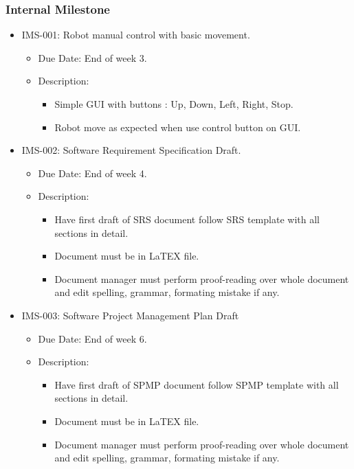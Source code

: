 \documentclass[11pt, a4paper]{article}
\begin{document}
		\subsubsection{Internal Milestone}
			\begin{itemize}
				\item IMS-001: Robot manual control with basic movement.
				\begin{itemize}
					\item Due Date: End of week 3.
					\item Description:
					\begin{itemize}
						\item Simple GUI with buttons : Up, Down, Left, Right, Stop.
						\item Robot move as expected when use control button on GUI.
					\end{itemize}
				\end{itemize}
				\item IMS-002: Software Requirement Specification Draft.
				\begin{itemize}
					\item Due Date: End of week 4.
					\item Description:
					\begin{itemize}
						\item Have first draft of SRS document follow SRS template with all sections in detail.
						\item Document must be in LaTEX file.
						\item Document manager must perform proof-reading over whole document and edit spelling, grammar, formating mistake if any.
					\end{itemize}
				\end{itemize}
				\item IMS-003: Software Project Management Plan Draft
				\begin{itemize}
					\item Due Date: End of week 6.
					\item Description:
					\begin{itemize}
						\item Have first draft of SPMP document follow SPMP template with all sections in detail.
						\item Document must be in LaTEX file.
						\item Document manager must perform proof-reading over whole document and edit spelling, grammar, formating mistake if any.
					\end{itemize}

\end{itemize}
\end{itemize}
\end{document}
